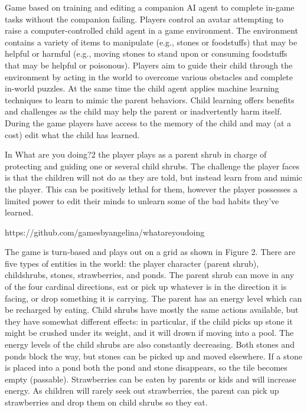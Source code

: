 \documentclass{sig-alternate}
\begin{document}
Game based on training and editing a companion AI agent to complete in-game tasks without the companion failing.
Players control an avatar attempting to raise a computer-controlled child agent in a game environment.
The environment contains a variety of items to manipulate (e.g., stones or foodstuffs) that may be helpful or harmful (e.g., moving stones to stand upon or consuming foodstuffs that may be helpful or poisonous).
Players aim to guide their child through the environment by acting in the world to overcome various obstacles and complete in-world puzzles.
At the same time the child agent applies machine learning techniques to learn to mimic the parent behaviors.
Child learning offers benefits and challenges as the child may help the parent or inadvertently harm itself.
During the game players have access to the memory of the child and may (at a cost) edit what the child has learned.

In What are you doing?2 the player plays as a parent shrub in
charge of protecting and guiding one or several child shrubs. The
challenge the player faces is that the children will not do as they
are told, but instead learn from and mimic the player. This can be
positively lethal for them, however the player possesses a limited
power to edit their minds to unlearn some of the bad habits they've
learned.

https://github.com/gamesbyangelina/whatareyoudoing

The game is turn-based and plays out on a grid as shown in Figure
2. There are five types of entities in the world: the player
character (parent shrub), childshrubs, stones, strawberries, and
ponds. The parent shrub can move in any of the four cardinal
directions, eat or pick up whatever is in the direction it is facing,
or drop something it is carrying. The parent has an energy level
which can be recharged by eating. Child shrubs have mostly the
same actions available, but they have somewhat different effects:
in particular, if the child picks up stone it might be crushed under
its weight, and it will drown if moving into a pool. The energy
levels of the child shrubs are also constantly decreasing. Both
stones and ponds block the way, but stones can be picked up and
moved elsewhere. If a stone is placed into a pond both the pond
and stone disappears, so the tile becomes empty (passable).
Strawberries can be eaten by parents or kids and will increase
energy. As children will rarely seek out strawberries, the parent
can pick up strawberries and drop them on child shrubs so they
eat.
\end{document}
